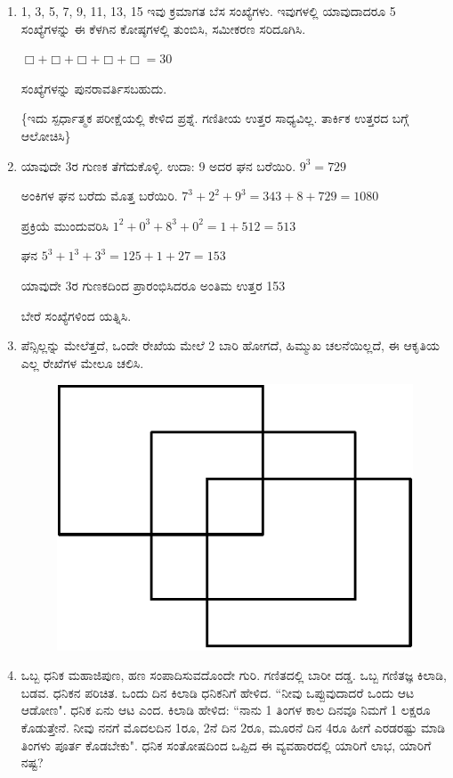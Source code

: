 \begin{enumerate}
\item 1, 3, 5, 7, 9, 11, 13, 15 ಇವು ಕ್ರಮಾಗತ ಬೆಸ ಸಂಖ್ಯೆಗಳು. ಇವುಗಳಲ್ಲಿ ಯಾವುದಾದರೂ 5 ಸಂಖ್ಯೆಗಳನ್ನು ಈ ಕೆಳಗಿನ ಕೋಷ್ಠಗಳಲ್ಲಿ ತುಂಬಿಸಿ, ಸಮೀಕರಣ ಸರಿದೂಗಿಸಿ. 

$\Box + \Box + \Box + \Box + \Box = 30$

ಸಂಖ್ಯೆಗಳನ್ನು ಪುನರಾವರ್ತಿಸಬಹುದು. 

\{ಇದು ಸ್ಪರ್ಧಾತ್ಮಕ ಪರೀಕ್ಷೆಯಲ್ಲಿ ಕೇಳಿದ ಪ್ರಶ್ನೆ. ಗಣಿತೀಯ ಉತ್ತರ ಸಾಧ್ಯವಿಲ್ಲ. ತಾರ್ಕಿಕ ಉತ್ತರದ ಬಗ್ಗೆ ಆಲೋಚಿಸಿ\}

\item ಯಾವುದೇ 3ರ ಗುಣಕ ತೆಗೆದುಕೊಳ್ಳಿ. ಉದಾ: 9 ಅದರ ಘನ ಬರೆಯಿರಿ. $9^{3} = 729$

ಅಂಕಿಗಳ ಘನ ಬರೆದು ಮೊತ್ತ ಬರೆಯಿರಿ. $7^{3} + 2^{2} + 9^{3} = 343 + 8 + 729 = 1080$

ಪ್ರಕ್ರಿಯೆ ಮುಂದುವರಿಸಿ $1^{2} + 0^{3} + 8^{3} + 0^{2} = 1 + 512 = 513$

ಘನ $5^{3} + 1^{3} + 3^{3} = 125 + 1 + 27 = 153$

ಯಾವುದೇ 3ರ ಗುಣಕದಿಂದ ಪ್ರಾರಂಭಿಸಿದರೂ ಅಂತಿಮ ಉತ್ತರ 153

ಬೇರೆ ಸಂಖ್ಯೆಗಳಿಂದ ಯತ್ನಿಸಿ. 

\item ಪೆನ್ಸಿಲ್ಲನ್ನು ಮೇಲೆತ್ತದೆ, ಒಂದೇ ರೇಖೆಯ ಮೇಲೆ 2 ಬಾರಿ ಹೋಗದೆ, ಹಿಮ್ಮುಖ ಚಲನೆಯಿಲ್ಲದೆ, ಈ ಆಕೃತಿಯ ಎಲ್ಲ ರೇಖೆಗಳ ಮೇಲೂ ಚಲಿಸಿ. 
\begin{figure}[H]
\centering
\includegraphics{images/chap8/q24.eps}
\end{figure}

\item ಒಬ್ಬ ಧನಿಕ ಮಹಾಜಿಪುಣ, ಹಣ ಸಂಪಾದಿಸುವದೊಂದೇ ಗುರಿ. ಗಣಿತದಲ್ಲಿ ಬಾರೀ ದಡ್ಡ. ಒಬ್ಬ ಗಣಿತಜ್ಞ ಕಿಲಾಡಿ, ಬಡವ. ಧನಿಕನ ಪರಿಚಿತ. ಒಂದು ದಿನ ಕಿಲಾಡಿ ಧನಿಕನಿಗೆ ಹೇಳಿದ. ``ನೀವು ಒಪ್ಪುವುದಾದರೆ ಒಂದು ಆಟ ಆಡೋಣ". ಧನಿಕ ಏನು ಆಟ ಎಂದ. ಕಿಲಾಡಿ ಹೇಳಿದ: ``ನಾನು 1 ತಿಂಗಳ ಕಾಲ ದಿನವೂ ನಿಮಗೆ 1 ಲಕ್ಷರೂ ಕೊಡುತ್ತೇನೆ. ನೀವು ನನಗೆ ಮೊದಲದಿನ 1ರೂ, 2ನೆ ದಿನ 2ರೂ, ಮೂರನೆ ದಿನ 4ರೂ ಹೀಗೆ ಎರಡರಷ್ಟು ಮಾಡಿ ತಿಂಗಳು ಪೂರ್ತ ಕೊಡಬೇಕು". ಧನಿಕ ಸಂತೋಷದಿಂದ ಒಪ್ಪಿದ ಈ ವ್ಯವಹಾರದಲ್ಲಿ ಯಾರಿಗೆ ಲಾಭ, ಯಾರಿಗೆ ನಷ್ಟ? 


\end{enumerate}
